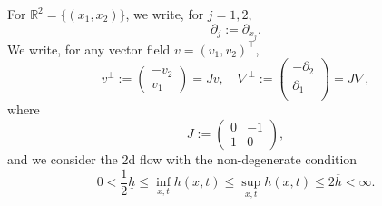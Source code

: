 \documentclass[reqno,11pt]{amsart}
\DeclareMathOperator{\curl}{curl}
\theoremstyle{plain}
\theoremstyle{definition}
\numberwithin{equation}{section}
\begin{document}
For $ \mathbb R^2 = \lbrace (x_1, x_2) \rbrace $, we write, for $j =1,2 $,
\begin{equation}
    \label{def:2d-drvt}
    \partial_j := \partial_{x_j}.
\end{equation}
We write, for any vector field $ v = (v_1, v_2)^\top $, 
\[
v^{\perp}:=\begin{pmatrix}
    -v_2 \\
    v_1
\end{pmatrix} = J v, \quad\nabla^{\perp}:= \begin{pmatrix}
    -\partial_2 \\
    \partial_1 \\
\end{pmatrix} = J \nabla ,
\]
where
\begin{equation}
\label{def:anti-matrix}
    J:= \begin{pmatrix}
        0 & -1 \\ 1 & 0
    \end{pmatrix},
\end{equation}
and we consider the 2d flow with the non-degenerate condition
\begin{equation}
    \label{non-degenerate-nD}
    0<\frac{1}{2}\underline h \leq \inf_{x,t} h(x,t) \leq \sup_{x,t} h(x,t) \leq 2 \overline h < \infty. 
\end{equation}
\end{document}
